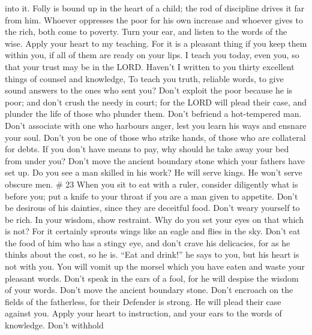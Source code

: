 into it.  Folly is bound up in the heart of a child; the
rod of discipline drives it far from him.  Whoever
oppresses the poor for his own increase and whoever gives to the rich,
both come to poverty.  Turn your ear, and listen to the
words of the wise. Apply your heart to my teaching.  For
it is a pleasant thing if you keep them within you, if all of them are
ready on your lips.  I teach you today, even you, so that
your trust may be in the LORD.  Haven't I written to you
thirty excellent things of counsel and knowledge,  To
teach you truth, reliable words, to give sound answers to the ones who
sent you?  Don't exploit the poor because he is poor; and
don't crush the needy in court;  for the LORD will plead
their case, and plunder the life of those who plunder them.
 Don't befriend a hot-tempered man. Don't associate with
one who harbours anger,  lest you learn his ways and
ensnare your soul.  Don't you be one of those who strike
hands, of those who are collateral for debts.  If you
don't have means to pay, why should he take away your bed from under
you?  Don't move the ancient boundary stone which your
fathers have set up.  Do you see a man skilled in his
work? He will serve kings. He won't serve obscure men. \# 23
 When you sit to eat with a ruler, consider diligently
what is before you;  put a knife to your throat if you are
a man given to appetite.  Don't be desirous of his
dainties, since they are deceitful food.  Don't weary
yourself to be rich. In your wisdom, show restraint.  Why
do you set your eyes on that which is not? For it certainly sprouts
wings like an eagle and flies in the sky.  Don't eat the
food of him who has a stingy eye, and don't crave his delicacies,
 for as he thinks about the cost, so he is. ``Eat and
drink!'' he says to you, but his heart is not with you. 
You will vomit up the morsel which you have eaten and waste your
pleasant words.  Don't speak in the ears of a fool, for he
will despise the wisdom of your words.  Don't move the
ancient boundary stone. Don't encroach on the fields of the fatherless,
 for their Defender is strong. He will plead their case
against you.  Apply your heart to instruction, and your
ears to the words of knowledge.  Don't withhold
